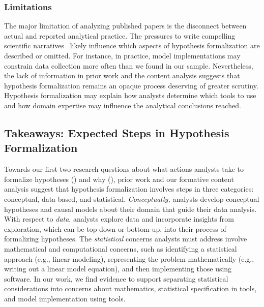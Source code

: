 \subsubsection{Limitations}
The major limitation of analyzing published papers is the disconnect between
actual and reported analytical practice. The pressures to write compelling
scientific narratives~\cite{kerr1998harking} likely influence which aspects of
hypothesis formalization are described or omitted. For instance, in practice, model
implementations may constrain data collection more often than we found in our
sample. Nevertheless, the lack of information in prior work and the content
analysis suggests that hypothesis formalization remains an opaque process
deserving of greater scrutiny. Hypothesis formalization may explain how analysts
determine which tools to use and how domain expertise may influence the analytical conclusions reached. 

\subsection{Takeaways: Expected Steps in Hypothesis Formalization}
Towards our first two research questions about what actions analysts take to
formalize hypotheses (\rqSteps) and why (\rqProcess), prior work and our
formative content analysis suggest that hypothesis formalization involves steps
in three categories: conceptual, data-based, and statistical.
\textit{Conceptually,} analysts develop conceptual hypotheses and causal models
about their domain that guide their data analysis. With respect to
\textit{data}, analysts explore data and incorporate insights from exploration,
which can be top-down or bottom-up, into their process of formalizing
hypotheses. The \textit{statistical} concerns analysts must address involve
mathematical and computational concerns, such as identifying a statistical
approach (e.g., linear modeling), representing the problem mathematically (e.g.,
writing out a linear model equation), and then implementing those using
software. In our work, we find evidence to support separating statistical
considerations into concerns about mathematics, statistical specification in
tools, and model implementation using tools.


